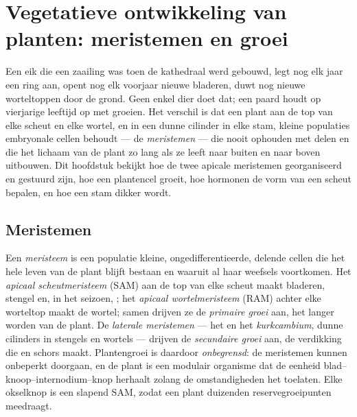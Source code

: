 \chapter{Vegetatieve ontwikkeling van planten: meristemen en groei}\label{ch:b2:plant-meristems}

Een eik die een zaailing was toen de kathedraal werd gebouwd, legt nog elk
jaar een ring  aan, opent nog elk voorjaar nieuwe bladeren, duwt nog
nieuwe worteltoppen door de grond. Geen enkel dier doet dat; een paard
houdt op vierjarige leeftijd op met groeien. Het verschil is dat een plant
aan de top van elke scheut en elke wortel, en in een dunne cilinder in elke
stam, kleine populaties embryonale cellen behoudt --- de \emph{meristemen}
--- die nooit ophouden met delen en die het lichaam van de plant zo lang
als ze leeft naar buiten en naar boven uitbouwen. Dit hoofdstuk bekijkt hoe
de twee apicale meristemen georganiseerd en gestuurd zijn, hoe een
plantencel groeit, hoe hormonen de vorm van een scheut bepalen, en hoe een
stam dikker wordt.

\section{Meristemen}

\begin{definition}\label{def:b2:plant-meristems:meristem}
Een \emph{meristeem} is een populatie kleine, ongedifferentieerde, delende
cellen die het hele leven van de plant blijft bestaan en waaruit al haar
weefsels voortkomen. Het \emph{apicaal scheutmeristeem} (SAM) aan de top
van elke scheut maakt bladeren, stengel en, in het seizoen, ; het
\emph{apicaal wortelmeristeem} (RAM) achter elke worteltop maakt de wortel;
samen drijven ze de \emph{primaire groei} aan, het langer worden van de
plant. De \emph{laterale meristemen} --- het \emph{} en het
\emph{kurkcambium}, dunne cilinders in stengels en wortels --- drijven de
\emph{secundaire groei} aan, de verdikking die  en schors maakt.
Plantengroei is daardoor \emph{onbegrensd}: de meristemen kunnen
onbeperkt doorgaan, en de plant is een modulair organisme dat de eenheid
blad--knoop--internodium--knop herhaalt zolang de omstandigheden het
toelaten. Elke okselknop is een slapend SAM, zodat een plant duizenden
reservegroeipunten meedraagt.
\end{definition}

